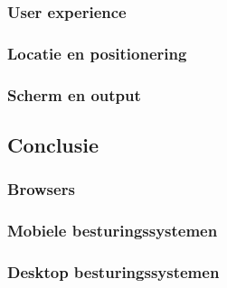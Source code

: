 \subsubsection{User experience}
\subsubsection{Locatie en positionering}
\subsubsection{Scherm en output}

\subsection{Conclusie }

\subsubsection{Browsers}

\subsubsection{Mobiele besturingssystemen }

\subsubsection{Desktop besturingssystemen}